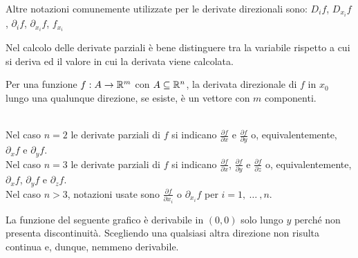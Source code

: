 \begin{definition}
	\begin{note}
		Altre notazioni comunemente utilizzate per le derivate direzionali sono: $D_i f$, $D_{x_i} f$, $\partial_i f$, $\partial_{x_i} f$, $f_{x_i}$
	\end{note}
	\begin{note}
		Nel calcolo delle derivate parziali è bene distinguere tra la variabile rispetto a cui si deriva ed il valore in cui la derivata viene calcolata.
	\end{note}
	\begin{note}
		Per una funzione $f: A \to \mathbb{R}^m$ con $A \subseteq \mathbb{R}^n$, la derivata direzionale di $f$ in $x_0$ lungo una qualunque direzione, se esiste, è un vettore con $m$ componenti.
	\end{note}
	\begin{note}\hfill\\
		Nel caso $n = 2$ le derivate parziali di $f$ si indicano $\frac{\partial f}{\partial x}$ e $\frac{\partial f}{\partial y}$ o, equivalentemente, $\partial_x f$ e $\partial_y f$.\\
		Nel caso $n = 3$ le derivate parziali di $f$ si indicano $\frac{\partial f}{\partial x}$, $\frac{\partial f}{\partial y}$ e $\frac{\partial f}{\partial z}$ o, equivalentemente, $\partial_x f$, $\partial_y f$ e $\partial_z f$.\\
		Nel caso $n > 3$, notazioni usate sono $\frac{\partial f}{\partial x_i}$ o $\partial_{x_i} f$ per $i = 1,\:\dotsc\:,n$.
	\end{note}
\end{definition}
\begin{example}
	\label{ex:deriv_solo_alcune_direz}
	La funzione del seguente grafico è derivabile in $(0,0)$ solo lungo $y$ perché non presenta discontinuità. Scegliendo una qualsiasi altra direzione non risulta continua e, dunque, nemmeno derivabile.
	\begin{figure}[H]
		\begin{subfigure}{.49\textwidth}
			\centering
		\end{subfigure}
		\begin{subfigure}{.49\textwidth}
			\centering
		\end{subfigure}
	\end{figure}
\end{example}
